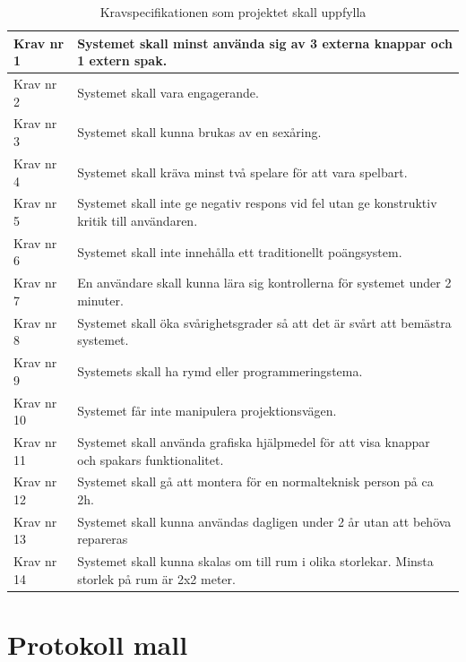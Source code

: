 \documentclass[a4paper,12pt,oneside,final]{extbook}
\begin{document}
	

\begin{table}[H]
	\centering
	\caption{Kravspecifikationen som projektet skall uppfylla}
	\label{Krav}
	\begin{tabular}{ | m{5em} | m{30em}| } 
		\hline
		Krav nr 1& Systemet skall minst använda sig av 3 externa knappar och 1 extern spak.   \\ 
		\hline
		Krav nr 2 & Systemet skall vara engagerande.  \\ 
		\hline
		Krav nr 3 & Systemet skall kunna brukas av en sexåring. \\ 
		\hline
		Krav nr 4& Systemet skall kräva minst två spelare för att vara spelbart. \\ 
		\hline
		Krav nr 5 & Systemet skall inte ge negativ respons vid fel utan ge konstruktiv kritik till användaren. \\ 
		\hline
		Krav nr 6 & Systemet skall inte innehålla ett traditionellt poängsystem. \\ 
		\hline
		Krav nr 7& En användare skall kunna lära sig kontrollerna för systemet under 2 minuter. \\ 
		\hline
		Krav nr 8 & Systemet skall öka svårighetsgrader så att det är svårt att bemästra systemet. \\ 
		\hline
		Krav nr 9 & Systemets skall ha rymd eller programmeringstema. \\ 
		\hline
		Krav nr 10& Systemet får inte manipulera projektionsvägen. \\ 
		\hline
		Krav nr 11& Systemet skall använda grafiska hjälpmedel för att visa knappar och spakars funktionalitet.  \\ 
		\hline
		Krav nr 12& Systemet skall gå att montera för en normalteknisk person på ca 2h. \\ 
		\hline
		Krav nr 13& Systemet skall kunna användas dagligen under 2 år utan att behöva repareras \\ 
		\hline
		Krav nr 14 & Systemet skall kunna skalas om till rum i olika storlekar. Minsta storlek på rum är 2x2 meter. \\ 
		\hline
	\end{tabular}

\end{table}


\chapter{Protokoll mall}\label{protokoll}
\end{document}
